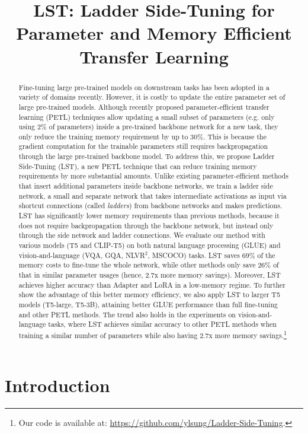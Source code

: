 \title{LST: Ladder Side-Tuning for Parameter and Memory Efficient Transfer Learning}

\begin{abstract}
 Fine-tuning large pre-trained models on downstream tasks has been adopted in a variety of domains recently. However, it is costly to update the entire parameter set of large pre-trained models. Although recently proposed parameter-efficient transfer learning (PETL) techniques allow updating a small subset of parameters (e.g. only using $2\%$ of parameters) inside a pre-trained backbone network for a new task, they only reduce the training memory requirement by up to $30\%$.
    This is because the gradient computation for the trainable parameters still requires backpropagation through the large pre-trained backbone model. To address this, we propose Ladder Side-Tuning (LST), a new PETL technique that can reduce training memory requirements by more substantial amounts. Unlike existing parameter-efficient methods that insert additional parameters inside backbone networks, we train a ladder side network, a small and separate network that takes intermediate activations as input via shortcut connections (called \textit{ladders}) from backbone networks and makes predictions. LST has significantly lower memory requirements than previous methods, because it does not require backpropagation through the backbone network, but instead only through the side network and ladder connections. We evaluate our method with various models (T5 and CLIP-T5) on both natural language processing (GLUE) and vision-and-language (VQA, GQA, NLVR$^2$, MSCOCO) tasks. LST saves $69\%$ of the memory costs to fine-tune the whole network, while other methods only save $26\%$ of that in similar parameter usages (hence, 2.7x more memory savings). Moreover, LST achieves higher accuracy than Adapter and LoRA in a low-memory regime. To further show the advantage of this better memory efficiency, we also apply LST to larger T5 models (T5-large, T5-3B), attaining better GLUE performance than full fine-tuning and other PETL methods. The trend also holds in the experiments on vision-and-language tasks, where LST achieves similar accuracy to other PETL methods when training a similar number of parameters while also having 2.7x more memory savings.\footnote{Our code is available at: \url{https://github.com/ylsung/Ladder-Side-Tuning}.}
\end{abstract}

\section{Introduction}

